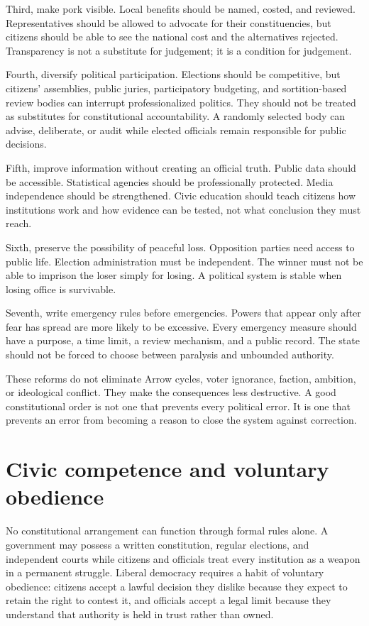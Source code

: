 ﻿\documentclass[12pt,a4paper]{book}
\begin{document}
Third, make pork visible.  Local benefits should be named, costed, and
reviewed.  Representatives should be allowed to advocate for their
constituencies, but citizens should be able to see the national cost and the
alternatives rejected.  Transparency is not a substitute for judgement; it
is a condition for judgement.

Fourth, diversify political participation.  Elections should be competitive,
but citizens' assemblies, public juries, participatory budgeting, and
sortition-based review bodies can interrupt professionalized politics.  They
should not be treated as substitutes for constitutional accountability.  A
randomly selected body can advise, deliberate, or audit while elected
officials remain responsible for public decisions.

Fifth, improve information without creating an official truth.  Public data
should be accessible.  Statistical agencies should be professionally
protected.  Media independence should be strengthened.  Civic education
should teach citizens how institutions work and how evidence can be tested,
not what conclusion they must reach.

Sixth, preserve the possibility of peaceful loss.  Opposition parties need
access to public life.  Election administration must be independent.  The
winner must not be able to imprison the loser simply for losing.  A political
system is stable when losing office is survivable.

Seventh, write emergency rules before emergencies.  Powers that appear only
after fear has spread are more likely to be excessive.  Every emergency
measure should have a purpose, a time limit, a review mechanism, and a public
record.  The state should not be forced to choose between paralysis and
unbounded authority.

These reforms do not eliminate Arrow cycles, voter ignorance, faction,
ambition, or ideological conflict.  They make the consequences less
destructive.  A good constitutional order is not one that prevents every
political error.  It is one that prevents an error from becoming a reason to
close the system against correction.

\section{Civic competence and voluntary obedience}

No constitutional arrangement can function through formal rules alone.  A
government may possess a written constitution, regular elections, and
independent courts while citizens and officials treat every institution as a
weapon in a permanent struggle.  Liberal democracy requires a habit of
voluntary obedience: citizens accept a lawful decision they dislike because
they expect to retain the right to contest it, and officials accept a legal
limit because they understand that authority is held in trust rather than
owned.
\end{document}
